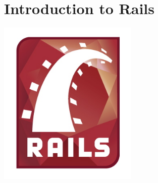 \documentclass[xcolor=svgnames]{beamer}
\begin{document}
\section{Introduction to Rails}
\begin{frame}
\transwipe
  \begin{center}
    \includegraphics[width=0.5\textwidth]{rails.jpg}
  \end{center}
\end{frame}
\end{document}
